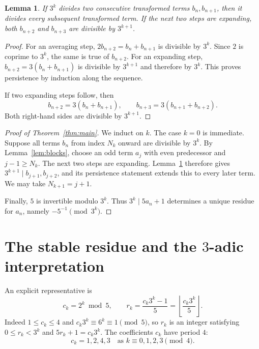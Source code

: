\documentclass[11pt]{article}
\newtheorem{lemma}[theorem]{Lemma}
\begin{document}
\begin{lemma}\label{lem:preserve}
If $3^k$ divides two consecutive transformed terms $b_n,b_{n+1}$, then it
divides every subsequent transformed term. If the next two steps are
expanding, both $b_{n+2}$ and $b_{n+3}$ are divisible by $3^{k+1}$.
\end{lemma}
\begin{proof}
For an averaging step, $2b_{n+2}=b_n+b_{n+1}$ is divisible by $3^k$.
Since $2$ is coprime to $3^k$, the same is true of $b_{n+2}$. For an
expanding step, $b_{n+2}=3(b_n+b_{n+1})$ is divisible by $3^{k+1}$ and
therefore by $3^k$. This proves persistence by induction along the sequence.

If two expanding steps follow, then
\[
 b_{n+2}=3(b_n+b_{n+1}),\qquad
 b_{n+3}=3(b_{n+1}+b_{n+2}).
\]
Both right-hand sides are divisible by $3^{k+1}$.
\end{proof}

\begin{proof}[Proof of Theorem~\ref{thm:main}]
We induct on $k$. The case $k=0$ is immediate. Suppose all terms $b_n$
from index $N_k$ onward are divisible by $3^k$. By
Lemma~\ref{lem:blocks}, choose an odd term $a_j$ with even predecessor and
$j-1\ge N_k$. The next two steps are expanding. Lemma~\ref{lem:preserve}
therefore gives $3^{k+1}\mid b_{j+1},b_{j+2}$, and its persistence statement
extends this to every later term. We may take $N_{k+1}=j+1$.

Finally, $5$ is invertible modulo $3^k$. Thus $3^k\mid 5a_n+1$ determines
a unique residue for $a_n$, namely $-5^{-1}\pmod{3^k}$.
\end{proof}

\section{The stable residue and the \texorpdfstring{$3$}{3}-adic interpretation}

An explicit representative is
\begin{equation}
 c_k=2^k\bmod5,\qquad
 r_k=\frac{c_k3^k-1}{5}
     =\left\lfloor\frac{c_k3^k}{5}\right\rfloor.
 \label{eq:residue}
\end{equation}
Indeed $1\le c_k\le4$ and $c_k3^k\equiv6^k\equiv1\pmod5$, so $r_k$ is
an integer satisfying $0\le r_k<3^k$ and $5r_k+1=c_k3^k$.
The coefficients $c_k$ have period $4$:
\[
 c_k=1,2,4,3\quad\text{as }k\equiv0,1,2,3\pmod4.
\]
\end{document}
